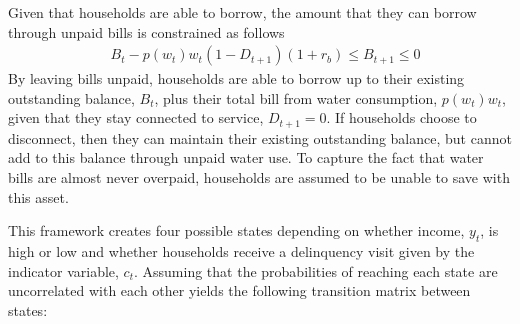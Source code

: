 \documentclass[12pt]{article}
\begin{document}
Given that households are able to borrow, the amount that they can borrow through unpaid bills is constrained as follows
\begin{align}\label{eq:borrowconstraint}
&B_t -  p(w_t) w_t (1-D_{t+1})(1+r_b) \leq B_{t+1} \leq 0 
\end{align}
By leaving bills unpaid, households are able to borrow up to their existing outstanding balance, $B_t$, plus their total bill from water consumption, $p(w_t) w_t$, given that they stay connected to service, $D_{t+1}=0$.  If households choose to disconnect, then they can maintain their existing outstanding balance, but cannot add to this balance through unpaid water use.  To capture the fact that water bills are almost never overpaid, households are assumed to be unable to save with this asset.

This framework creates four possible states depending on whether income, $y_t$, is high or low and whether households receive a delinquency visit given by the indicator variable, $c_t$.  Assuming that the probabilities of reaching each state are uncorrelated with each other yields the following transition matrix between states:




\end{document}
